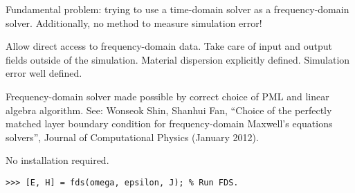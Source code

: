 \documentclass[landscape]{foils}
\renewcommand{\oursection}[1]{
\foilhead[-1.0cm]{#1}
}
\begin{document}
% 
\BIT
\I  Fundamental problem: trying to use a time-domain solver as a 
        frequency-domain solver.
\I  Additionally, no method to measure simulation error!
\EIT
\newpage

\BIT
\I  Allow direct access to frequency-domain data.
\I  Take care of input and output fields outside of the simulation.
\I  Material dispersion explicitly defined.
\I  Simulation error well defined.
\EIT
\newpage

\BIT
\I  Frequency-domain solver made possible by correct choice of PML and 
        linear algebra algorithm.
\I  See: Wonseok Shin, Shanhui Fan, 
            ``Choice of the perfectly matched layer boundary condition for 
            frequency-domain Maxwell's equations solvers'',
            Journal of Computational Physics (January 2012).
\EIT


\oursection{Interface}
\BIT
\I  No installation required.
\begin{verbatim}
>>> [E, H] = fds(omega, epsilon, J); % Run FDS.
\end{verbatim}
\EIT
\end{document}
